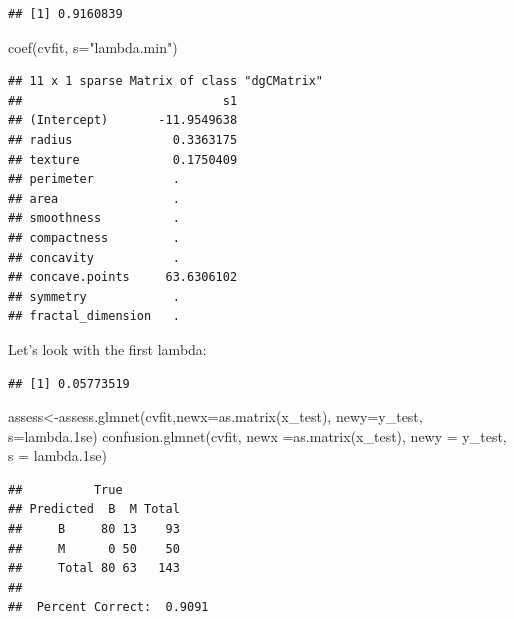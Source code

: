 \documentclass[
  11pt,
]{article}
\newenvironment{Shaded}{\begin{snugshade}}{\end{snugshade}}
\newcommand{\AttributeTok}[1]{\textcolor[rgb]{0.77,0.63,0.00}{#1}}
\newcommand{\FloatTok}[1]{\textcolor[rgb]{0.00,0.00,0.81}{#1}}
\newcommand{\FunctionTok}[1]{\textcolor[rgb]{0.00,0.00,0.00}{#1}}
\newcommand{\NormalTok}[1]{#1}
\newcommand{\OtherTok}[1]{\textcolor[rgb]{0.56,0.35,0.01}{#1}}
\newcommand{\SpecialCharTok}[1]{\textcolor[rgb]{0.00,0.00,0.00}{#1}}
\newcommand{\StringTok}[1]{\textcolor[rgb]{0.31,0.60,0.02}{#1}}
\begin{document}
\begin{verbatim}
## [1] 0.9160839
\end{verbatim}

\begin{Shaded}
\begin{Highlighting}[]
\FunctionTok{coef}\NormalTok{(cvfit, }\AttributeTok{s=}\StringTok{"lambda.min"}\NormalTok{)}
\end{Highlighting}
\end{Shaded}

\begin{verbatim}
## 11 x 1 sparse Matrix of class "dgCMatrix"
##                            s1
## (Intercept)       -11.9549638
## radius              0.3363175
## texture             0.1750409
## perimeter           .        
## area                .        
## smoothness          .        
## compactness         .        
## concavity           .        
## concave.points     63.6306102
## symmetry            .        
## fractal_dimension   .
\end{verbatim}

Let's look with the first lambda:

\begin{Shaded}
\end{Shaded}

\begin{verbatim}
## [1] 0.05773519
\end{verbatim}

\begin{Shaded}
\begin{Highlighting}[]
\NormalTok{assess}\OtherTok{\textless{}{-}}\FunctionTok{assess.glmnet}\NormalTok{(cvfit,}\AttributeTok{newx=}\FunctionTok{as.matrix}\NormalTok{(x\_test), }\AttributeTok{newy=}\NormalTok{y\_test, }\AttributeTok{s=}\StringTok{\textquotesingle{}lambda.1se\textquotesingle{}}\NormalTok{)}
\FunctionTok{confusion.glmnet}\NormalTok{(cvfit, }\AttributeTok{newx =}\FunctionTok{as.matrix}\NormalTok{(x\_test), }\AttributeTok{newy =}\NormalTok{ y\_test, }\AttributeTok{s =} \StringTok{\textquotesingle{}lambda.1se\textquotesingle{}}\NormalTok{)}
\end{Highlighting}
\end{Shaded}

\begin{verbatim}
##          True
## Predicted  B  M Total
##     B     80 13    93
##     M      0 50    50
##     Total 80 63   143
## 
##  Percent Correct:  0.9091
\end{verbatim}
\end{document}
